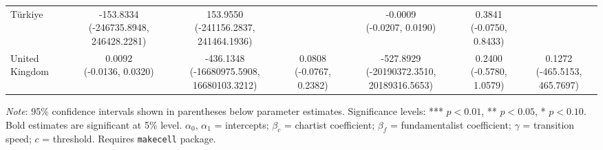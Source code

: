 \begin{table}[htbp]
{\begin{tabular}{l|cccccc}
Türkiye              & \makecell{-153.8334 \\ \scriptsize{(-246735.8948, 246428.2281)}} & \makecell{153.9550 \\ \scriptsize{(-241156.2837, 241464.1936)}} &   & \makecell{-0.0009 \\ \scriptsize{(-0.0207, 0.0190)}} & \makecell{0.3841 \\ \scriptsize{(-0.0750, 0.8433)}} &   \\
United Kingdom       & \makecell{0.0092 \\ \scriptsize{(-0.0136, 0.0320)}} & \makecell{-436.1348 \\ \scriptsize{(-16680975.5908, 16680103.3212)}} & \makecell{0.0808 \\ \scriptsize{(-0.0767, 0.2382)}} & \makecell{-527.8929 \\ \scriptsize{(-20190372.3510, 20189316.5653)}} & \makecell{0.2400 \\ \scriptsize{(-0.5780, 1.0579)}} & \makecell{0.1272 \\ \scriptsize{(-465.5153, 465.7697)}} \\
\bottomrule
\end{tabular}%
}
\begin{tablenotes}
\small
\textit{Note}: 95\% confidence intervals shown in parentheses below parameter estimates. 
Significance levels: *** $p<0.01$, ** $p<0.05$, * $p<0.10$. 
Bold estimates are significant at 5\% level.
$\alpha_0$, $\alpha_1$ = intercepts; $\beta_c$ = chartist coefficient; 
$\beta_f$ = fundamentalist coefficient; $\gamma$ = transition speed; $c$ = threshold.
Requires \texttt{makecell} package.
\end{tablenotes}
\end{table}

